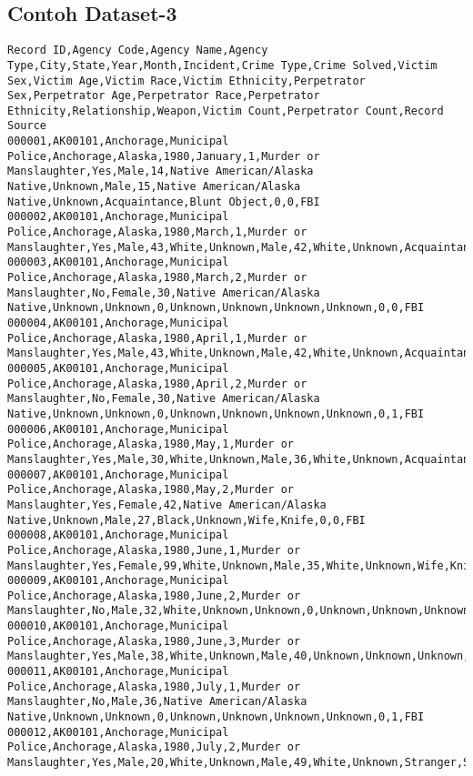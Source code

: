 \subsection{Contoh Dataset-3}
\label{lamp:E-Contoh Datase1-3}
\begin{lstlisting}
Record ID,Agency Code,Agency Name,Agency Type,City,State,Year,Month,Incident,Crime Type,Crime Solved,Victim Sex,Victim Age,Victim Race,Victim Ethnicity,Perpetrator Sex,Perpetrator Age,Perpetrator Race,Perpetrator Ethnicity,Relationship,Weapon,Victim Count,Perpetrator Count,Record Source
000001,AK00101,Anchorage,Municipal Police,Anchorage,Alaska,1980,January,1,Murder or Manslaughter,Yes,Male,14,Native American/Alaska Native,Unknown,Male,15,Native American/Alaska Native,Unknown,Acquaintance,Blunt Object,0,0,FBI
000002,AK00101,Anchorage,Municipal Police,Anchorage,Alaska,1980,March,1,Murder or Manslaughter,Yes,Male,43,White,Unknown,Male,42,White,Unknown,Acquaintance,Strangulation,0,0,FBI
000003,AK00101,Anchorage,Municipal Police,Anchorage,Alaska,1980,March,2,Murder or Manslaughter,No,Female,30,Native American/Alaska Native,Unknown,Unknown,0,Unknown,Unknown,Unknown,Unknown,0,0,FBI
000004,AK00101,Anchorage,Municipal Police,Anchorage,Alaska,1980,April,1,Murder or Manslaughter,Yes,Male,43,White,Unknown,Male,42,White,Unknown,Acquaintance,Strangulation,0,0,FBI
000005,AK00101,Anchorage,Municipal Police,Anchorage,Alaska,1980,April,2,Murder or Manslaughter,No,Female,30,Native American/Alaska Native,Unknown,Unknown,0,Unknown,Unknown,Unknown,Unknown,0,1,FBI
000006,AK00101,Anchorage,Municipal Police,Anchorage,Alaska,1980,May,1,Murder or Manslaughter,Yes,Male,30,White,Unknown,Male,36,White,Unknown,Acquaintance,Rifle,0,0,FBI
000007,AK00101,Anchorage,Municipal Police,Anchorage,Alaska,1980,May,2,Murder or Manslaughter,Yes,Female,42,Native American/Alaska Native,Unknown,Male,27,Black,Unknown,Wife,Knife,0,0,FBI
000008,AK00101,Anchorage,Municipal Police,Anchorage,Alaska,1980,June,1,Murder or Manslaughter,Yes,Female,99,White,Unknown,Male,35,White,Unknown,Wife,Knife,0,0,FBI
000009,AK00101,Anchorage,Municipal Police,Anchorage,Alaska,1980,June,2,Murder or Manslaughter,No,Male,32,White,Unknown,Unknown,0,Unknown,Unknown,Unknown,Firearm,0,0,FBI
000010,AK00101,Anchorage,Municipal Police,Anchorage,Alaska,1980,June,3,Murder or Manslaughter,Yes,Male,38,White,Unknown,Male,40,Unknown,Unknown,Unknown,Firearm,0,1,FBI
000011,AK00101,Anchorage,Municipal Police,Anchorage,Alaska,1980,July,1,Murder or Manslaughter,No,Male,36,Native American/Alaska Native,Unknown,Unknown,0,Unknown,Unknown,Unknown,Unknown,0,1,FBI
000012,AK00101,Anchorage,Municipal Police,Anchorage,Alaska,1980,July,2,Murder or Manslaughter,Yes,Male,20,White,Unknown,Male,49,White,Unknown,Stranger,Shotgun,0,0,FBI

\end{lstlisting}
